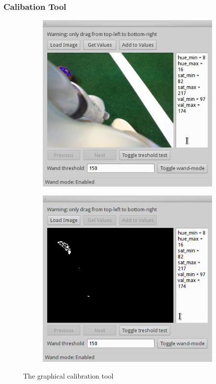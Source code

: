 \documentclass[11pt,a4paper,oneside]{article}
\begin{document}
\subsubsection{Calibation Tool}
\begin{figure}[htbp]
    \centering
    \begin{subfigure}[b]{0.45\textwidth}
        \centering
        \includegraphics[width=\textwidth]{calibration_tool1.jpg}
    \end{subfigure}
    \begin{subfigure}[b]{0.45\textwidth}
        \centering
        \includegraphics[width=\textwidth]{calibration_tool2.png}
    \end{subfigure}
    \caption{The graphical calibration tool}
    \label{fig:calibrationtool}
\end{figure}
\end{document}
